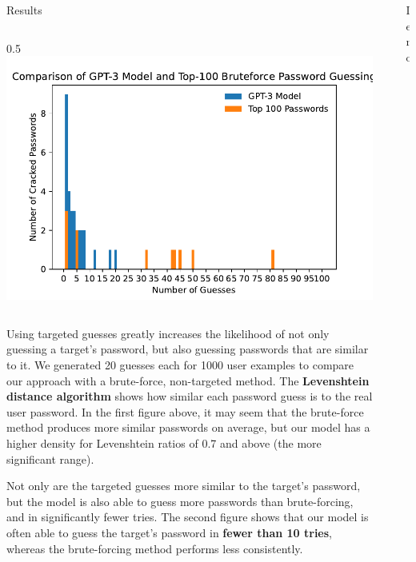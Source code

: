 \documentclass[final]{beamer}
\newlength{\sepwidth}
\newlength{\colwidth}
\newcommand{\separatorcolumn}{\begin{column}{\sepwidth}\end{column}}
\begin{document}
\begin{frame}[t]
\begin{columns}[t]
\begin{column}{\colwidth}
\begin{block}{Results}
\begin{columns}
    \begin{column}{0.5\colwidth}
       \includegraphics[width=\linewidth]{comparison_graph.pdf}
    \end{column}
    \end{columns}
        
        Using targeted guesses greatly increases the likelihood of not only guessing a target's password, but also guessing passwords that are similar to it. We generated 20 guesses each for 1000 user examples to compare our approach with a brute-force, non-targeted method. The \textbf{Levenshtein distance algorithm} shows how similar each password guess is to the real user password. In the first figure above, it may seem that the brute-force method produces more similar passwords on average, but our model has a higher density for Levenshtein ratios of 0.7 and above (the more significant range).
        
        Not only are the targeted guesses more similar to the target's password, but the model is also able to guess more passwords than brute-forcing, and in significantly fewer tries. The second figure shows that our model is often able to guess the target's password in \textbf{fewer than 10 tries}, whereas the brute-forcing method performs less consistently.
        
  \end{block}
\end{column}

\separatorcolumn

\begin{column}{\colwidth}

    \begin{block}{Demo}
    

\end{block}
\end{column}
\end{columns}
\end{frame}
\end{document}
